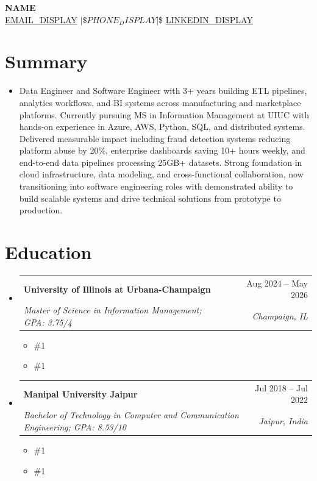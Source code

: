 \documentclass[letterpaper,11pt]{article}
\makeatletter
\newcommand{\resumeSubheading}[4]{
  \vspace{0pt}\item
    \begin{tabular*}{\textwidth}{l@{\extracolsep{\fill}}r}
      \textbf{#1} & #2 \\
      \textit{#3} & \textit{#4} \\ 
    \end{tabular*}\vspace{-6pt}
}
\newcommand{\resumeEducationCoursework}[1]{
  \vspace{-9pt} 
  \begin{itemize}[leftmargin=0pt, label={}]
    \item {\#1}
  \end{itemize}
}
\newcommand{\resumeEducationCertifications}[1]{
  \vspace{-15pt} 
  \begin{itemize}[leftmargin=0pt, label={}]
    \item {\#1}
  \end{itemize}
}
\newcommand{\resumeSubHeadingListStart}{\begin{itemize}[leftmargin=0pt,label={},itemsep=-2pt]}
\newcommand{\resumeSubHeadingListEnd}{\end{itemize}}
\makeatother
\begin{document}
\justifying

\begin{center}
    \textbf{\LARGE {{NAME}}} \\ \vspace{5pt}
    \href{mailto:{{EMAIL_URL}}}{{EMAIL_DISPLAY}} $|\$ {{PHONE_DISPLAY}} $|\$ \href{%
      {{LINKEDIN_URL}}%
    }{%
      {{LINKEDIN_DISPLAY}}%
    }
\end{center}

\section{Summary}
\begin{itemize}[leftmargin=0pt, label={}]
  \item { Data Engineer and Software Engineer with 3+ years building ETL pipelines, analytics workflows, and BI systems across manufacturing and marketplace platforms. Currently pursuing MS in Information Management at UIUC with hands-on experience in Azure, AWS, Python, SQL, and distributed systems. Delivered measurable impact including fraud detection systems reducing platform abuse by 20\%, enterprise dashboards saving 10+ hours weekly, and end-to-end data pipelines processing 25GB+ datasets. Strong foundation in cloud infrastructure, data modeling, and cross-functional collaboration, now transitioning into software engineering roles with demonstrated ability to build scalable systems and drive technical solutions from prototype to production. }
\end{itemize}

\section{Education}
  \resumeSubHeadingListStart
    \resumeSubheading
      {University of Illinois at Urbana-Champaign}{Aug 2024 -- May 2026}
      {Master of Science in Information Management; GPA: 3.75/4}{Champaign, IL}
      \resumeEducationCoursework{\textbf{Relevant Coursework:} Applied Machine Learning, Cloud Computing Applications, Data Mining, Data Warehousing and Business Intelligence, Information Modeling, Data Visualization, Data and Statistical Models}
      \resumeEducationCertifications{\textbf{Certifications:} Getting Started with Microsoft Azure, Cloud Computing, The Complete Prompt Engineering for AI Bootcamp}
    \resumeSubheading
      {Manipal University Jaipur}{Jul 2018 -- Jul 2022}
      {Bachelor of Technology in Computer and Communication Engineering; GPA: 8.53/10}{Jaipur, India}
      \resumeEducationCoursework{\textbf{Relevant Coursework:} Data Structures and Algorithms, Relational Database Management Systems, Operating Systems, Computer Networks, Software Testing, Cryptography and Security}
      \resumeEducationCertifications{\textbf{Certifications:} Certified Ethical Hacker (EC Council), Google Project Management Specialization, Networking in Google Cloud, Architecting with Google Kubernetes Engine, Web Application Security Testing with Burp Suite}
  \resumeSubHeadingListEnd
\end{document}
